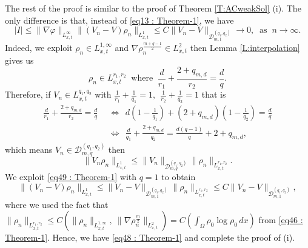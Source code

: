 \documentclass{amsart}
\numberwithin{equation}{section}
\begin{document}
 

The rest of the proof is similar to the proof of Theorem \ref{T:ACweakSol} (i). The only difference is that, instead of  \eqref{eq13 : Theorem-1}, we have
\begin{equation}\label{eq48 : Theorem-1}
| I |\leq \|\nabla \varphi \|_{L_{x,t}^\infty} \|(V_n - V)\rho_n \|_{L_{x,t}^{1}}
\leq C \|V_n - V \|_{\mathcal{D}_{m,1}^{(q_1,q_2)}} \longrightarrow 0,  \  \mbox{ as } \   n\rightarrow \infty.
\end{equation}
 Indeed, we exploit $\rho_n \in L_{x,t}^{1,\infty}$ and $\nabla \rho_n^{\frac{m+q-1}{2}} \in L_{x,t}^{2}$ then 
    Lemma \ref{L:interpolation} gives us
  \begin{equation}
  \rho_n \in L_{x,t}^{r_1,r_2} \ \text{ where } \ \frac{d}{r_1} + \frac{2 + q_{m,d}}{r_2}=\frac{d}{q}.
  \end{equation}
 Therefore, if  $V_n \in L_{x,t}^{q_1,q_2}$ with $\frac{1}{r_1}+\frac{1}{q_1}=1, ~~  \frac{1}{r_2}+\frac{1}{q_2}=1$ that is   
\begin{equation}
\begin{aligned}
\frac{d}{r_1} + \frac{2 + q_{m,d}}{r_2}=\frac{d}{q} ~~ &\Longleftrightarrow  ~~ d\left(1-\frac{1}{q_1} \right) + (2+q_{m,d})\left(1-\frac{1}{q_2} \right)=\frac{d}{q}\\
 &\Longleftrightarrow  ~~ \frac{d}{q_1} + \frac{2+q_{m,d}}{q_2} = \frac{d(q-1)}{q} + 2+q_{m,d},
\end{aligned}
\end{equation}
which means $V_n \in \mathcal{D}_{m,q}^{(q_1, q_2)}$ then
 \begin{equation}\label{eq49 : Theorem-1}
 \|V_n\rho_n\|_{L_{x,t}^1} \leq \| V_n\|_{\mathcal{D}_{m,q}^{(q_1,q_2)}} \|\rho_n \|_{L_{x,t}^{r_1,r_2}}.                                     
 \end{equation}
 We exploit \eqref{eq49 : Theorem-1} with $q=1$ to obtain
 \begin{equation*}\label{eq50 : Theorem-1}
\|(V_n-V)\rho_n \|_{L_{x,t}^{1}}
\leq \|V_n-V \|_{{\mathcal{D}}_{m,1}^{({q}_1, {q}_2)}} \| \rho_n\|_{L_{x,t}^{r_1, r_2}}
 \leq C \|V_n-V \|_{\mathcal{D}_{m,1}^{(q_1,q_2)}} ,
\end{equation*}
where we used the fact that $\| \rho_n\|_{L_{x,t}^{r_1, r_2}} \leq C (\|\rho_n\|_{L_{x,t}^{1,\infty}},~ \|\nabla \rho_n^{\frac{m}{2}}\|_{L_{x,t}^{2}} )
=C ( \int_{\Omega} \rho_{0} \log \rho_{0} \,dx )$
from \eqref{eq46 : Theorem-1}.
Hence, we have \eqref{eq48 : Theorem-1} and complete the proof of (i).
\end{document}
